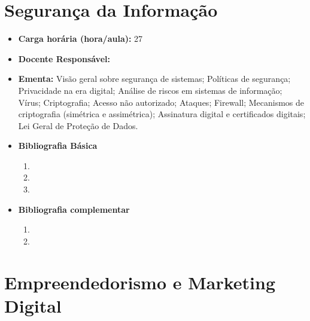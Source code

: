 \documentclass[11pt,fleqn]{book} %
\begin{document}

\newpage
\section{Segurança da Informação}\label{disc:seginfo}

\begin{itemize}
	\item \textbf{Carga horária (hora/aula):} 27
	\item \textbf{Docente Responsável:}~
	\item \textbf{Ementa:} 
	Visão geral sobre segurança de sistemas;
	Políticas de segurança; 
	Privacidade na era digital;
	Análise de riscos em sistemas de informação;
	Vírus;
	Criptografia; 
	Acesso não autorizado; 
	Ataques;
	Firewall;
	Mecanismos de criptografia (simétrica e assimétrica);
	Assinatura digital e certificados digitais;
	Lei Geral de Proteção de Dados.

	\item \textbf{Bibliografia Básica}
	\begin{enumerate}
		\item 
		\item 
		\item 
	\end{enumerate}
	\item \textbf{Bibliografia complementar}
	\begin{enumerate}
		\item 
		\item
	\end{enumerate} 	
\end{itemize}


\newpage
\section{Empreendedorismo e Marketing Digital}\label{disc:empmkt}
\end{document}
